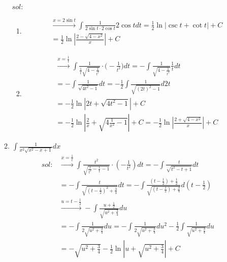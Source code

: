 \begin{enumerate}[{例}1.]
\begin{enumerate}[(1)]
                    $sol:$
                    \begin{enumerate}[$1\circ$]
                        \item
                            \begin{align*}
                                &\xrightarrow{x=2\sin t}\int\frac{1}{2\sin t\cdot 2\cos t}2\cos tdt=\frac{1}{2}\ln\left|\csc t+\cot t\right|+C\\
                                &=\frac{1}{2}\ln\left|\frac{2-\sqrt{4-x^2}}{x}\right|+C
                            \end{align*}
                        \item
                            \begin{align*}
                                &\xrightarrow{x=\frac{1}{t}}\int\frac{1}{\frac{1}{t}\sqrt{4-\frac{1}{t^2}}}\cdot \bigg(-\frac{1}{t^2}\bigg) dt=-\int\frac{1}{\sqrt{4-\frac{1}{t^2}}}\frac{1}{t}dt\\
                                &=-\int\frac{1}{\sqrt{4t^2-1}}dt=-\frac{1}{2}\int\frac{1}{\sqrt{(2t)^2-1}}d2t\\
                                &=-\frac{1}{2}\ln\left|2t+\sqrt{4t^2-1}\right|+C\\
                                &=-\frac{1}{2}\ln\left|\frac{2}{x}+\sqrt{4\frac{1}{x^2}-1}\right|+C=-\frac{1}{2}\ln\left|\frac{2+\sqrt{4-x^2}}{x}\right|+C
                            \end{align*}
                        \end{enumerate}
                \item $\int \frac{1}{x^2\sqrt{x^2-x+1}}dx$
                    \begin{align*}
                        sol:&\xrightarrow{x=\frac{1}{t}}\int\frac{t^2}{\sqrt{\frac{1}{t^2}-\frac{1}{t}-1}}\cdot(-\frac{1}{t^2})dt=-\int\frac{t}{\sqrt{t^2-t+1}}dt\\
                            &=-\int\frac{t}{\sqrt{(t-\frac{1}{2})^2+\frac{3}{4}}}dt=-\int\frac{(t-\frac{1}{2})+\frac{1}{2}}{\sqrt{(t-\frac{1}{2})+\frac{3}{4}}}d(t-\frac{1}{2})\\
                            &\xrightarrow{u=t-\frac{1}{2}}-\int\frac{u+\frac{1}{2}}{\sqrt{u^2+\frac{3}{4}}}du\\
                            &=-\int\frac{1}{2\sqrt{u^2+\frac{3}{4}}}du=-\int\frac{1}{2\sqrt{u^2+\frac{3}{4}}}du^2-\frac{1}{2}\int\frac{1}{\sqrt{u^2+\frac{3}{4}}}du\\
                            &=-\sqrt{u^2+\frac{3}{4}}-\frac{1}{2}\ln\left|u+\sqrt{u^2+\frac{3}{4}}\right|+C\\

\end{align*}
\end{enumerate}
\end{enumerate}

